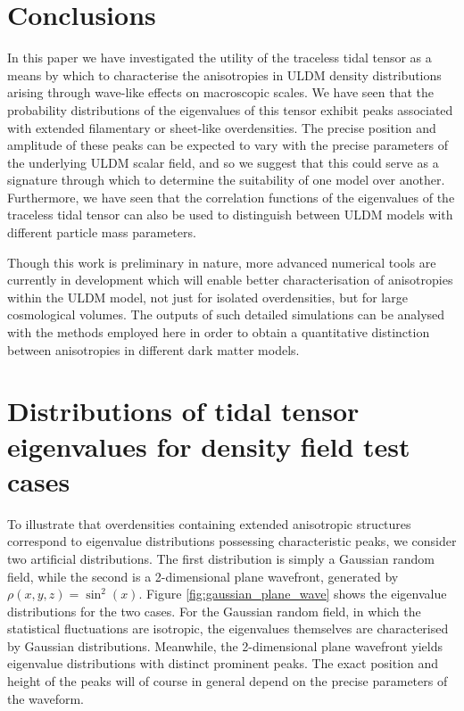 \documentclass[a4paper,11pt]{article}
\begin{document}
\section{Conclusions}\label{sec:conclusion}

In this paper we have investigated the utility of the traceless tidal tensor as a means by which to characterise the anisotropies in ULDM density distributions arising through wave-like effects on macroscopic scales. We have seen that the probability distributions of the eigenvalues of this tensor exhibit peaks associated with extended filamentary or sheet-like overdensities. The precise position and amplitude of these peaks can be expected to vary with the precise parameters of the underlying ULDM scalar field, and so we suggest that this could serve as a signature through which to determine the suitability of one model over another. Furthermore, we have seen that the correlation functions of the eigenvalues of the traceless tidal tensor can also be used to distinguish between ULDM models with different particle mass parameters. 

Though this work is preliminary in nature, more advanced numerical tools are currently in development which will enable better characterisation of anisotropies within the ULDM model, not just for isolated overdensities, but for large cosmological volumes. The outputs of such detailed simulations can be analysed with the methods employed here in order to obtain a quantitative distinction between anisotropies in different dark matter models. 











\appendix


\section{Distributions of tidal tensor eigenvalues for density field test cases}\label{app:prob_distro_eg}

To illustrate that overdensities containing extended anisotropic structures correspond to eigenvalue distributions possessing characteristic peaks, we consider two artificial distributions. The first distribution is simply a Gaussian random field, while the second is a 2-dimensional plane wavefront, generated by $\rho(x,y,z)=\sin^2{(x)}$. Figure \ref{fig:gaussian_plane_wave} shows the eigenvalue distributions for the two cases. For the Gaussian random field, in which the statistical fluctuations are isotropic, the eigenvalues themselves are characterised by Gaussian distributions. Meanwhile, the 2-dimensional plane wavefront yields eigenvalue distributions with distinct prominent peaks. The exact position and height of the peaks will of course in general depend on the precise parameters of the waveform.
\end{document}
